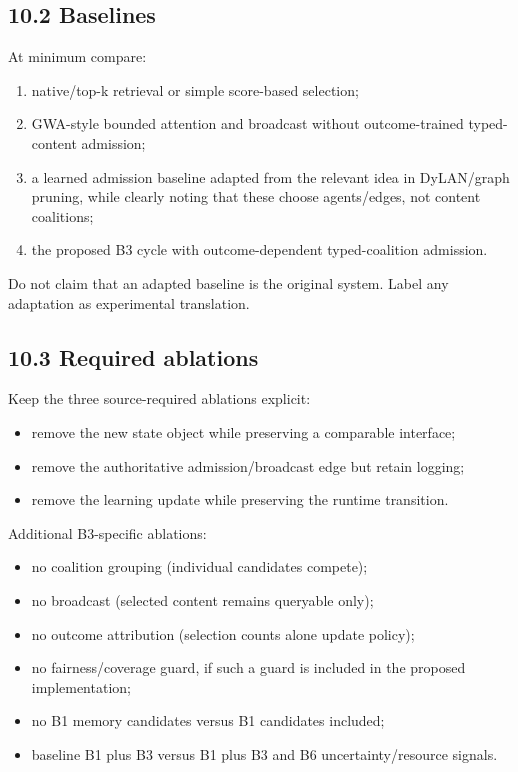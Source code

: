 \subsection{10.2 Baselines}\label{102-baselines}

At minimum compare:

\begin{enumerate}
\def\labelenumi{\arabic{enumi}.}
\tightlist
\item
  native/top-k retrieval or simple score-based selection;
\item
  GWA-style bounded attention and broadcast without outcome-trained typed-content admission;
\item
  a learned admission baseline adapted from the relevant idea in DyLAN/graph pruning, while clearly noting that these choose agents/edges, not content coalitions;
\item
  the proposed B3 cycle with outcome-dependent typed-coalition admission.
\end{enumerate}

Do not claim that an adapted baseline is the original system. Label any adaptation as experimental translation.

\subsection{10.3 Required ablations}\label{103-required-ablations}

Keep the three source-required ablations explicit:

\begin{itemize}
\tightlist
\item
  remove the new state object while preserving a comparable interface;
\item
  remove the authoritative admission/broadcast edge but retain logging;
\item
  remove the learning update while preserving the runtime transition.
\end{itemize}

Additional B3-specific ablations:

\begin{itemize}
\tightlist
\item
  no coalition grouping (individual candidates compete);
\item
  no broadcast (selected content remains queryable only);
\item
  no outcome attribution (selection counts alone update policy);
\item
  no fairness/coverage guard, if such a guard is included in the proposed implementation;
\item
  no B1 memory candidates versus B1 candidates included;
\item
  baseline B1 plus B3 versus B1 plus B3 and B6 uncertainty/resource signals.
\end{itemize}

